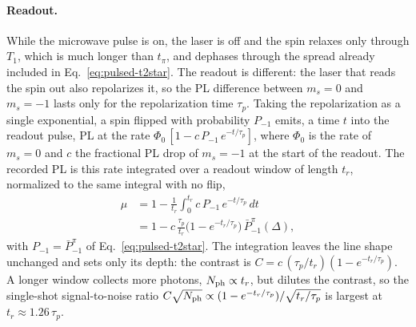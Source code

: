 \paragraph{Readout.} While the microwave pulse is on, the laser is off and the spin relaxes only through $T_1$, which
is much longer than $t_\pi$, and dephases through the spread already included in Eq.~\eqref{eq:pulsed-t2star}. The
readout is different: the laser that reads the spin out also repolarizes it, so the PL difference between $m_s=0$
and $m_s=-1$ lasts only for the repolarization time $\tau_p$. Taking the repolarization as a single exponential, a
spin flipped with probability $P_{-1}$ emits, a time $t$ into the readout pulse, PL at the rate
$\Phi_0\,[1-c\,P_{-1}\,e^{-t/\tau_p}]$, where $\Phi_0$ is the rate of $m_s=0$ and $c$ the fractional PL drop of
$m_s=-1$ at the start of the readout. The recorded PL is this rate integrated over a readout window of length $t_r$,
normalized to the same integral with no flip,
\begin{equation}
  \begin{aligned}
  \mu&=1-\frac{1}{t_r}\int_0^{t_r}c\,P_{-1}\,e^{-t/\tau_p}\,dt\\
  &=1-c\,\frac{\tau_p}{t_r}\big(1-e^{-t_r/\tau_p}\big)\,\bar P_{-1}^{\pi}(\Delta) ,
  \end{aligned}
  \label{eq:pulsed-readout}
\end{equation}
with $P_{-1}=\bar P_{-1}^{\pi}$ of Eq.~\eqref{eq:pulsed-t2star}. The integration leaves the line shape unchanged and
sets only its depth: the contrast is $C=c\,(\tau_p/t_r)(1-e^{-t_r/\tau_p})$. A longer window collects more photons,
$N_{\rm ph}\propto t_r$, but dilutes the contrast, so the single-shot signal-to-noise ratio
$C\sqrt{N_{\rm ph}}\propto(1-e^{-t_r/\tau_p})/\sqrt{t_r/\tau_p}$ is largest at $t_r\approx1.26\,\tau_p$.
